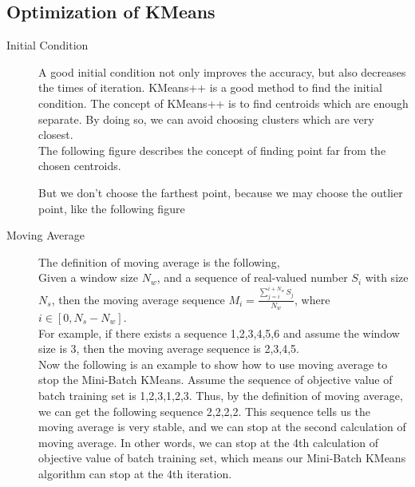 \documentclass[final,leqno,onefignum,onetabnum]{siamltexmm}
\begin{document}
\subsection{Optimization of KMeans}
\begin{description}
\item[Initial Condition]

A good initial condition not only improves the accuracy, but also decreases the times of iteration. KMeans++ is a good method to find the initial condition. The  concept of KMeans++ is to find centroids which are enough separate. By doing so, we can avoid choosing clusters which are very closest. \\

The following figure describes the concept of finding point far from the chosen centroids.
\begin{center}
	\begin{figure}[H]
	\end{figure}
\end{center}

But we don't choose the farthest point, because we may choose the outlier point, like the following figure
\begin{center}
	\begin{figure}[H]
	\end{figure}
\end{center}

\item[Moving Average]

The definition of moving average is the following, \\
Given a window size $N_w$, and a sequence of real-valued number $S_i$ with size $N_s$, then the moving average sequence $M_i = \frac{\sum_{j=i}^{i+N_w} S_j}{N_w}$, where $i \in [0, N_s-N_w]$. \\

For example, if there exists a sequence 1,2,3,4,5,6 and assume the window size is 3, then the moving average sequence is 2,3,4,5. \\

Now the following is an example to show how to use moving average to stop the Mini-Batch KMeans. Assume the sequence of objective value of batch training set is 1,2,3,1,2,3. Thus, by the definition of moving average, we can get the following sequence 2,2,2,2. This sequence tells us the moving average is very stable, and we can stop at the second calculation of moving average. In other words, we can stop at the 4th calculation of objective value of batch training set, which means our Mini-Batch KMeans algorithm can stop at the 4th iteration. \\


\end{description}
\end{document}
